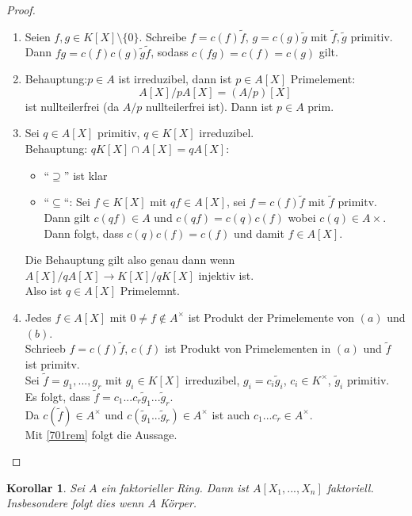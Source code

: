 \documentclass[10pt,a4paper]{article}
\newcounter{thm}[section]
\theoremstyle{definition}
\theoremstyle{plain}
\newtheorem{kor}[thm]{Korollar}
\theoremstyle{remark}
\begin{document}
\begin{proof}
	\begin{enumerate}
		\item Seien $f,g\in K[X]\setminus\{0\}$. Schreibe $f=c(f)\tilde{f}$, $g=c(g)\tilde{g}$ mit $\tilde{f},\tilde{g}$ primitiv. Dann $fg=c(f)c(g)\tilde{g}\tilde f$, sodass $c(fg)=c(f)=c(g)$ gilt.
		\item Behauptung:$p\in A$ ist irreduzibel, dann ist $p\in A[X]$ Primelement:\\
		\[A[X]/pA[X]=(A/p)[X]\]
		ist nullteilerfrei (da $A/p$ nullteilerfrei ist).
		Dann ist $p\in A$ prim.
		\item Sei $q\in A[X]$ primitiv, $q\in K[X]$ irreduzibel.\\
		Behauptung: $qK[X]\cap A[X]=qA[X]$:
		\begin{itemize}
			\item ``$\supseteq$'' ist klar
			\item ``$\subseteq$``: Sei $f\in K[X]$ mit $qf\in A[X]$, sei $f=c(f)\tilde f$ mit $\tilde f$ primitv. Dann gilt $c(qf)\in A$ und $c(qf)=c(q)c(f)$ wobei $c(q)\in A\times$.\\
			Dann folgt, dass $c(q)c(f)=c(f)$ und damit $f\in A[X]$.\\
		\end{itemize}
		Die Behauptung gilt also genau dann wenn $A[X]/qA[X]\rightarrow K[X]/qK[X]$ injektiv ist.\\
		Also ist $q\in A[X]$ Primelemnt.
		\item Jedes $f\in A[X]$ mit $0\neq f\notin A^\times$ ist Produkt der Primelemente von $(a)$ und $(b)$.\\
		Schrieeb $f=c(f)\tilde f$, $c(f)$ ist Produkt von Primelementen in $(a)$ und $\tilde{f}$ ist primitv.\\
		Sei $\tilde{f}=g_1,...,g_r$ mit $g_i\in K[X]$ irreduzibel, $g_i=c_i\tilde{g}_i$, $c_i\in K^\times$, $\tilde g_i$ primitiv.\\
		Es folgt, dass $\tilde f=c_1...c_r\tilde g_1...\tilde g_r$.\\
		Da $c(\tilde f)\in A^\times$ und $c(\tilde g_1...\tilde g_r)\in A^\times$ ist auch $c_1...c_r\in A^\times$.\\
		Mit \ref{701rem} folgt die Aussage.
	\end{enumerate}
\end{proof}

\begin{kor}
	Sei $A$ ein faktorieller Ring. Dann ist $A[X_1,...,X_n]$ faktoriell. \\
	Insbesondere folgt dies wenn $A$ Körper.
\end{kor}
\end{document}
